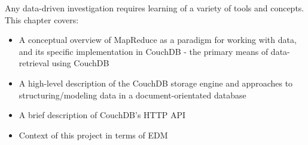Any data-driven investigation requires learning of a variety of tools and concepts. This chapter covers:

\begin{itemize}
    \item A conceptual overview of MapReduce as a paradigm for working with data, and its specific implementation in CouchDB - the primary means of data-retrieval using CouchDB
    \item A high-level description of the CouchDB storage engine and approaches to structuring/modeling data in a document-orientated database
    \item A brief description of CouchDB's HTTP API
    \item Context of this project in terms of EDM
\end{itemize}